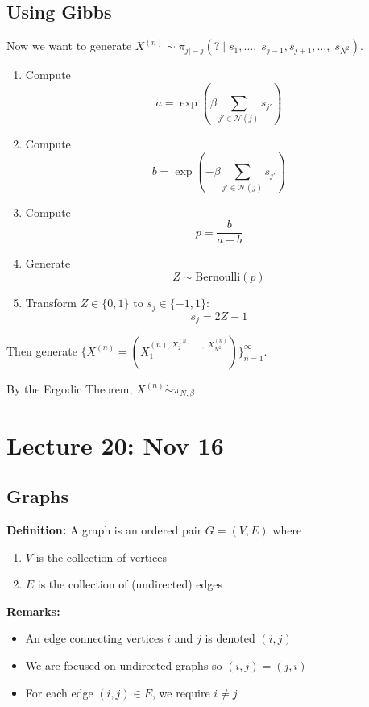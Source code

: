 \documentclass[12pt]{article}
\begin{document}
    \subsection{Using Gibbs}
        Now we want to generate $X^{(n)} \sim \pi_{j\vert -j}(? \; | \; s_1, \dots,\; s_{j-1}, s_{j+1}, \dots,\; s_{N^2})$.

        \begin{enumerate}
            \item Compute 
            \[a = \exp\left(\beta \sum_{j' \in \mathcal{N}(j)} s_{j'}\right)\]
            \item Compute 
            \[b = \exp\left(-\beta \sum_{j' \in \mathcal{N}(j)} s_{j'}\right)\]
            \item Compute
            \[p = \frac{b}{a + b}\]
            \item Generate 
            \[Z \sim \text{Bernoulli}(p)\]
            \item Transform $Z \in \{0, 1\}$ to $s_j \in \{-1, 1\}$:
            \[s_j = 2Z - 1\]
        \end{enumerate}
       
        Then generate $\{X^{(n)} = (X_1^{(n), X_2^{(n)}, \dots,\; X_{N^2}^{(n)}})\}_{n=1}^\infty$. 
        
        By the Ergodic Theorem, $X^{(n)} \dot \sim \pi_{N, \beta}$ 

\section{Lecture 20: Nov 16}
    \subsection{Graphs}
        \textbf{Definition:} A graph is an ordered pair $G = (V, E)$ where 
        \begin{enumerate}
            \item $V$ is the collection of vertices 
            \item $E$ is the collection of (undirected) edges 
        \end{enumerate}

        \textbf{Remarks:}
        \begin{itemize}
            \item An edge connecting vertices $i$ and $j$ is denoted $(i, j)$
            \item We are focused on undirected graphs so $(i, j) = (j, i)$ 
            \item For each edge $(i, j) \in E$, we require $i \neq j$
        \end{itemize}
\end{document}

